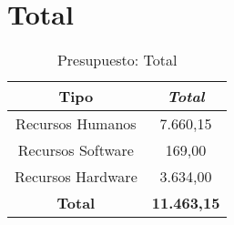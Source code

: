 \section{Total}

\begin{table}[htp]
	\centering
	\caption{Presupuesto: Total}\label{tab:total-budget}
	\begin{tabular}{cc}
		\toprule
    	\textbf{Tipo} 		& 	\emph{Total}\\
    	\midrule
    	Recursos Humanos	& 			7.660,15\\
		Recursos Software	&			169,00\\
		Recursos Hardware	&			3.634,00\\
		\textbf{Total}		&	\textbf{11.463,15}\\
    	\bottomrule
    \end{tabular}
\end{table}